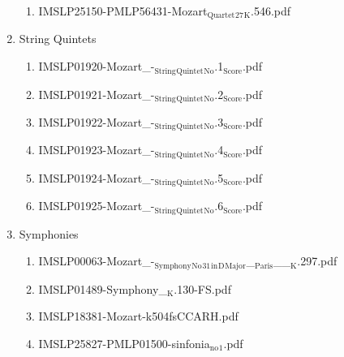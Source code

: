 \documentclass[11pt]{article}
\begin{document}
\begin{enumerate}
\begin{enumerate}
\item IMSLP25150-PMLP56431-Mozart$_{\text{Quartet}}$$_{\text{27}}$$_{\text{K}}$.546.pdf
\label{sec-1-1-1-1-44-49-9-24}
\end{enumerate}

\item String Quintets
\label{sec-1-1-1-1-44-49-10}
\begin{enumerate}
\item IMSLP01920-Mozart\_-$_{\text{String}}$$_{\text{Quintet}}$$_{\text{No}}$.1$_{\text{Score}}$.pdf
\label{sec-1-1-1-1-44-49-10-1}

\item IMSLP01921-Mozart\_-$_{\text{String}}$$_{\text{Quintet}}$$_{\text{No}}$.2$_{\text{Score}}$.pdf
\label{sec-1-1-1-1-44-49-10-2}

\item IMSLP01922-Mozart\_-$_{\text{String}}$$_{\text{Quintet}}$$_{\text{No}}$.3$_{\text{Score}}$.pdf
\label{sec-1-1-1-1-44-49-10-3}

\item IMSLP01923-Mozart\_-$_{\text{String}}$$_{\text{Quintet}}$$_{\text{No}}$.4$_{\text{Score}}$.pdf
\label{sec-1-1-1-1-44-49-10-4}

\item IMSLP01924-Mozart\_-$_{\text{String}}$$_{\text{Quintet}}$$_{\text{No}}$.5$_{\text{Score}}$.pdf
\label{sec-1-1-1-1-44-49-10-5}

\item IMSLP01925-Mozart\_-$_{\text{String}}$$_{\text{Quintet}}$$_{\text{No}}$.6$_{\text{Score}}$.pdf
\label{sec-1-1-1-1-44-49-10-6}
\end{enumerate}

\item Symphonies
\label{sec-1-1-1-1-44-49-11}
\begin{enumerate}
\item IMSLP00063-Mozart\_-$_{\text{Symphony}}$$_{\text{No}}$$_{\text{31}}$$_{\text{in}}$$_{\text{D}}$$_{\text{Major}}$\_$_{\text{Paris}}$\_\_$_{\text{K}}$.297.pdf
\label{sec-1-1-1-1-44-49-11-1}

\item IMSLP01489-Symphony\_$_{\text{K}}$.130-FS.pdf
\label{sec-1-1-1-1-44-49-11-2}

\item IMSLP18381-Mozart-k504fsCCARH.pdf
\label{sec-1-1-1-1-44-49-11-3}

\item IMSLP25827-PMLP01500-sinfonia$_{\text{no}}$$_{\text{1}}$.pdf
\label{sec-1-1-1-1-44-49-11-4}


\end{enumerate}
\end{enumerate}
\end{document}
